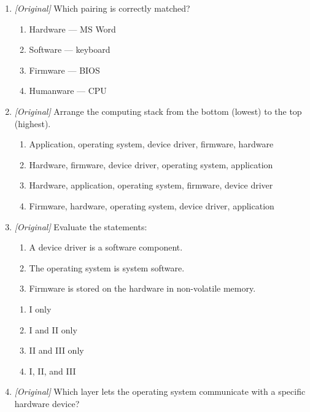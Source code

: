 \begin{enumerate}[label=\textbf{Q\arabic*.}, leftmargin=*]
\begin{enumerate}[label=\Alph*.]
    \item Firmware is stored in non-volatile memory.
    \item Humanware is the people component of a system.
  \end{enumerate}
\item \textit{[Original]} Which pairing is correctly matched?
  \begin{enumerate}[label=\Alph*.]
    \item Hardware --- MS Word
    \item Software --- keyboard
    \item Firmware --- BIOS
    \item Humanware --- CPU
  \end{enumerate}
\item \textit{[Original]} Arrange the computing stack from the bottom
  (lowest) to the top (highest).
  \begin{enumerate}[label=\Alph*.]
    \item Application, operating system, device driver, firmware, hardware
    \item Hardware, firmware, device driver, operating system, application
    \item Hardware, application, operating system, firmware, device driver
    \item Firmware, hardware, operating system, device driver, application
  \end{enumerate}
\item \textit{[Original]} Evaluate the statements:
  \begin{enumerate}[label=\Roman*.]
    \item A device driver is a software component.
    \item The operating system is system software.
    \item Firmware is stored on the hardware in non-volatile memory.
  \end{enumerate}
  \begin{enumerate}[label=\Alph*.]
    \item I only
    \item I and II only
    \item II and III only
    \item I, II, and III
  \end{enumerate}
\item \textit{[Original]} Which layer lets the operating system communicate
  with a specific hardware device?
  \begin{enumerate}[label=\Alph*.]

\end{enumerate}
\end{enumerate}
